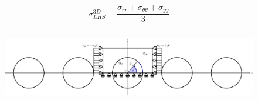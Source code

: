 \documentclass[first,firstsupp,lastsupp,last,hyperref,table]{ETHclass}
\begin{document}
\begin{frame}
\begin{columns}[c]
\begin{column}{0.5\textwidth}
\begin{figure}
\end{figure}
\vspace{-0.5cm}
\scriptsize
\begin{equation*}
\sigma^{3D}_{LHS}=\frac{\sigma_{rr}+\sigma_{\theta\theta}+\sigma_{yy}}{3}
\end{equation*}
\end{column}
\end{columns}
\vspace{-0.4cm}
\centering
\begin{figure}
\centering
\includegraphics[width=\textwidth]{refAngle.pdf}
\end{figure}
\end{frame}

\addtocounter{framenumber}{-1}
\end{document}

